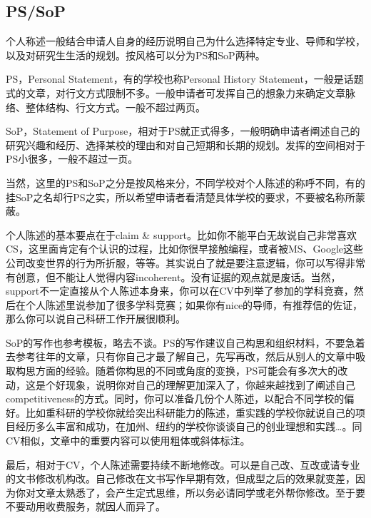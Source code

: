 \subsection{PS/SoP}

个人称述一般结合申请人自身的经历说明自己为什么选择特定专业、导师和学校，以及对研究生生活的规划。按风格可以分为PS和SoP两种。\par

PS，Personal Statement，有的学校也称Personal History Statement，一般是话题式的文章，对行文方式限制不多。一般申请者可发挥自己的想象力来确定文章脉络、整体结构、行文方式。一般不超过两页。\par

SoP，Statement of Purpose，相对于PS就正式得多，一般明确申请者阐述自己的研究兴趣和经历、选择某校的理由和对自己短期和长期的规划。发挥的空间相对于PS小很多，一般不超过一页。\par

当然，这里的PS和SoP之分是按风格来分，不同学校对个人陈述的称呼不同，有的挂SoP之名却行PS之实，所以希望申请者看清楚具体学校的要求，不要被名称所蒙蔽。\par

个人陈述的基本要点在于claim \& support。比如你不能平白无故说自己非常喜欢CS，这里面肯定有个认识的过程，比如你很早接触编程，或者被MS、Google这些公司改变世界的行为所折服，等等。其实说白了就是要注意逻辑，你可以写得非常有创意，但不能让人觉得内容incoherent。没有证据的观点就是废话。当然，support不一定直接从个人陈述本身来，你可以在CV中列举了参加的学科竞赛，然后在个人陈述里说参加了很多学科竞赛；如果你有nice的导师，有推荐信的佐证，那么你可以说自己科研工作开展很顺利。\par

SoP的写作也参考模板，略去不谈。PS的写作建议自己构思和组织材料，不要急着去参考往年的文章，只有你自己才最了解自己，先写再改，然后从别人的文章中吸取构思方面的经验。随着你构思的不同或角度的变换，PS可能会有多次大的改动，这是个好现象，说明你对自己的理解更加深入了，你越来越找到了阐述自己competitiveness的方式。同时，你可以准备几份个人陈述，以配合不同学校的偏好。比如重科研的学校你就给突出科研能力的陈述，重实践的学校你就说自己的项目经历多么丰富和成功，在加州、纽约的学校你谈谈自己的创业理想和实践\ldots{}。同CV相似，文章中的重要内容可以使用粗体或斜体标注。\par

最后，相对于CV，个人陈述需要持续不断地修改。可以是自己改、互改或请专业的文书修改机构改。自己修改在文书写作早期有效，但成型之后的效果就变差，因为你对文章太熟悉了，会产生定式思维，所以务必请同学或老外帮你修改。至于要不要动用收费服务，就因人而异了。
